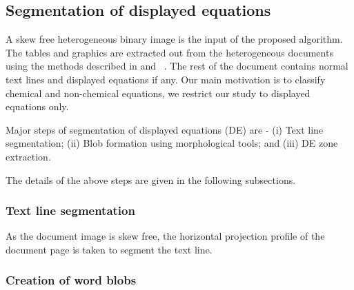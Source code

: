 \subsection{Segmentation of
displayed equations} A skew free heterogeneous binary image is the input of the proposed algorithm. The tables and graphics are
extracted out from the heterogeneous documents using the methods described in \cite{sekhar_06} and ~\cite{spc_07}. The rest of
the document contains normal text lines and displayed equations if any. Our main motivation is to classify chemical and non-chemical equations, we restrict our study to displayed equations only.

Major steps of segmentation of displayed equations (DE) are -  (i) Text line segmentation; (ii) Blob formation using morphological tools; and (iii) DE zone extraction.


The details of the above steps are given in the following subsections.

\subsubsection{Text line segmentation} 
As the document image is skew free, the horizontal projection profile of the document page is taken to segment the
text line. %

\subsubsection{Creation of word blobs} 

